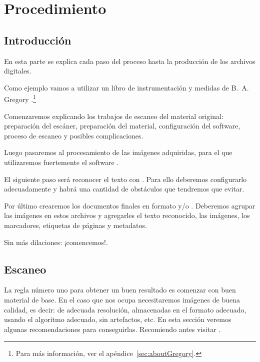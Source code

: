 \documentclass[%
	a5paper,
	10pt,
	twoside,
	openright,
	final,
]{memoir}
\begin{document}
{%
	\part{Procedimiento}

	\chapter{Introducción\label{sec:procedure}} En esta parte se explica cada paso del proceso hasta la producción de los archivos digitales.

	Como ejemplo vamos a utilizar un libro de instrumentación y medidas de B.~A. Gregory \cite{GregorySpringer}.\footnote{Para más información, ver el apéndice~\ref{sec:aboutGregory}.}

	Comenzaremos explicando los trabajos de escaneo del material original: preparación del escáner, preparación del material, configuración del software, proceso de escaneo y posibles complicaciones.

	Luego pasaremos al procesamiento de las imágenes adquiridas, para el que utilizaremos fuertemente el software \scantailor.

	El siguiente paso será reconocer el texto con \abbyy. Para ello deberemos configurarlo adecuadamente y habrá una cantidad de obstáculos que tendremos que evitar.

	Por último crearemos los documentos finales en formato \pdf y/o \djvu. Deberemos agrupar las imágenes en estos archivos y agregarles el texto reconocido, las imágenes, los marcadores, etiquetas de páginas y metadatos.

	Sin más dilaciones: ¡comencemos!.

	\chapter{Escaneo\label{sec:scanning}} La regla número uno para obtener un buen resultado es comenzar con buen material de base. En el caso que nos ocupa necesitaremos imágenes de buena calidad, es decir: de adecuada resolución, almacenadas en el formato adecuado, usando el algoritmo adecuado, sin artefactos, etc. En esta sección veremos algunas recomendaciones para conseguirlas. Recomiendo antes visitar \cite{ScanTips}.

}
\end{document}
